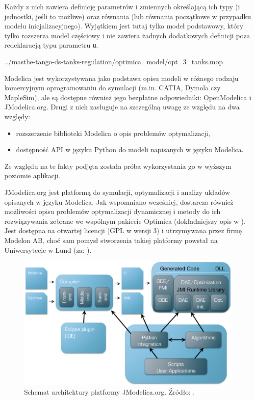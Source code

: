 Każdy z nich zawiera definicję parametrów i zmiennych określającą ich typy (i jednostki, jeśli to możliwe) oraz równania (lub równania początkowe w przypadku modelu inicjalizacyjnego). Wyjątkiem jest tutaj tylko model podstawowy, który tylko rozszerza model częściowy i nie zawiera żadnych dodatkowych definicji poza redeklaracją typu parametru \texttt{u}.


{../masthe-tango-ds-tanks-regulation/optimica_model/opt_3_tanks.mop}

Modelica jest wykorzystywana jako podstawa opisu modeli w różnego rodzaju komercyjnym oprogramowaniu do symulacji (m.in. CATIA, Dymola czy MapleSim), ale są dostępne również jego bezpłatne odpowiedniki: OpenModelica i JModelica.org. Drugi z nich zasługuje na szczególną uwagę ze względu na dwa względy:
\begin{itemize}
    \item rozszerzenie biblioteki Modelica o opis problemów optymalizacji,
    \item dostępność API w języku Python do modeli napisanych w języku Modelica.
\end{itemize} 
Ze względu na te fakty podjęta została próba wykorzystania go w wyższym poziomie aplikacji.

JModelica.org jest platformą do symulacji, optymalizacji i analizy układów opisanych w języku Modelica. Jak wspomniano wcześniej, dostarcza również możliwości opisu problemów optymalizacji dynamicznej i metody do ich rozwiązywania zebrane we wspólnym pakiecie Optimica (dokładniejszy opis w \cite{JModelicaUserGuide}). Jest dostępna na otwartej licencji (GPL w wersji 3) i utrzymywana przez firmę Modelon AB, choć sam pomysł stworzenia takiej platformy powstał na Uniwersytecie w Lund (za: \cite{JModelicaWebsite}).

\begin{figure}[htp]
    \centering
    \includegraphics[width=\textwidth]{Grafika/jmodelica_architecture}
    \caption{Schemat architektury platformy JModelica.org. Źródło: \cite{JModelicaWebsite}.}
    \label{fig:jmodelicaarchitecture}
\end{figure}

